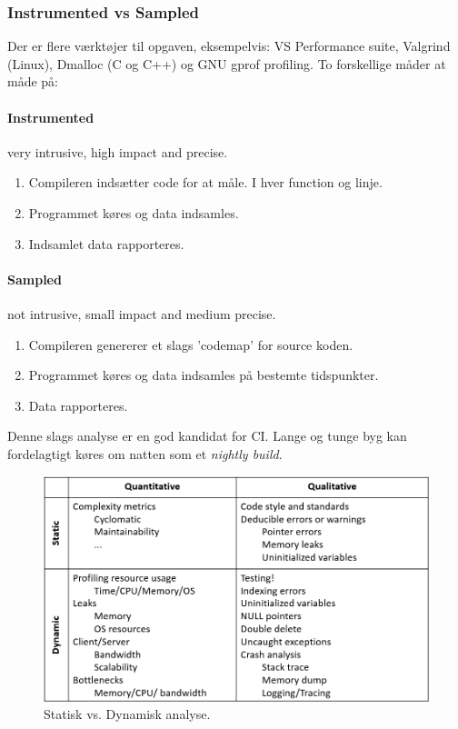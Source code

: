 \subsubsection{Instrumented vs Sampled}
Der er flere værktøjer til opgaven, eksempelvis: VS Performance suite, Valgrind (Linux), Dmalloc (C og C++) og GNU gprof profiling. To forskellige måder at måde på:

\paragraph{Instrumented} very intrusive, high impact and precise.

\begin{enumerate}
	\item Compileren indsætter code for at måle. I hver function og linje.
	\item Programmet køres og data indsamles.
	\item Indsamlet data rapporteres.
\end{enumerate}

\paragraph{Sampled} not intrusive, small impact and medium precise.

\begin{enumerate}
	\item Compileren genererer et slags 'codemap' for source koden.
	\item Programmet køres og data indsamles på bestemte tidspunkter.
	\item Data rapporteres.
\end{enumerate}

Denne slags analyse er en god kandidat for CI. Lange og tunge byg kan fordelagtigt køres om natten som et \textit{nightly build}.

\begin{figure}[h]
\centering
\includegraphics[width=\linewidth]{figs/static_dynamic}
\caption{Statisk vs. Dynamisk analyse.}
\label{fig:staticdynamic}
\end{figure}






